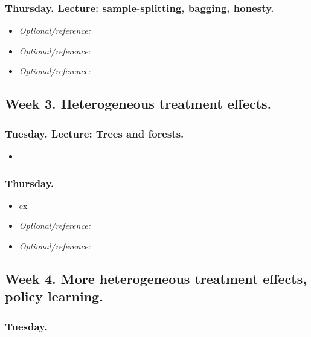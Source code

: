 \documentclass[letterpaper, 12pt, parskip=full,DIV=10]{scrartcl}
\begin{document}
\subsubsection*{Thursday. Lecture: sample-splitting, bagging, honesty.}

\begin{itemize}
\item  \textit{Optional/reference:}  
\item  \textit{Optional/reference:}  
\item \textit{Optional/reference:}  
\end{itemize}


\subsection*{Week 3. Heterogeneous treatment effects.}

\subsubsection*{Tuesday. Lecture: Trees and forests.}%

\begin{itemize}
\item {}
\end{itemize}




\subsubsection*{Thursday.}

\begin{itemize}
\item {} ex
\item  \textit{Optional/reference:} 
\item \textit{Optional/reference:}  
\end{itemize}

\subsection*{Week 4. More heterogeneous treatment effects, policy learning.}

\subsubsection*{Tuesday.}
\end{document}
